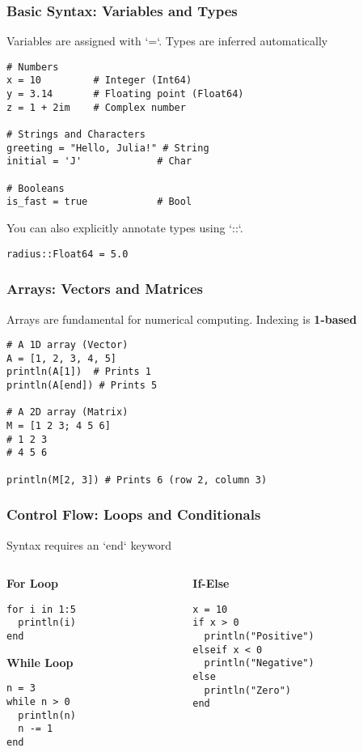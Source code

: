 \documentclass[aspectratio=169]{beamer}\usepackage[]{graphicx}\usepackage[]{xcolor}
\begin{document}
\begin{frame}[fragile]
  \frametitle{Basic Syntax: Variables and Types}
  Variables are assigned with `=`. Types are inferred automatically
  \begin{lstlisting}
# Numbers
x = 10         # Integer (Int64)
y = 3.14       # Floating point (Float64)
z = 1 + 2im    # Complex number

# Strings and Characters
greeting = "Hello, Julia!" # String
initial = 'J'             # Char

# Booleans
is_fast = true            # Bool\end{lstlisting}
  \vfill
  You can also explicitly annotate types using `::`.
  \begin{lstlisting}
radius::Float64 = 5.0\end{lstlisting}
\end{frame}

\begin{frame}[fragile]
  \frametitle{Arrays: Vectors and Matrices}
  Arrays are fundamental for numerical computing. Indexing is \textbf{1-based}
  \begin{lstlisting}
# A 1D array (Vector)
A = [1, 2, 3, 4, 5]
println(A[1])  # Prints 1
println(A[end]) # Prints 5

# A 2D array (Matrix)
M = [1 2 3; 4 5 6]
# 1 2 3
# 4 5 6

println(M[2, 3]) # Prints 6 (row 2, column 3)\end{lstlisting}
\end{frame}

\begin{frame}[fragile]
  \frametitle{Control Flow: Loops and Conditionals}
  Syntax requires an `end` keyword
  \begin{columns}[T]
    \begin{column}{.5\textwidth}
      \textbf{For Loop}
      \begin{lstlisting}
for i in 1:5
  println(i)
end\end{lstlisting}
      \textbf{While Loop}
      \begin{lstlisting}
n = 3
while n > 0
  println(n)
  n -= 1
end\end{lstlisting}
    \end{column}
    \begin{column}{.5\textwidth}
      \textbf{If-Else}
      \begin{lstlisting}
x = 10
if x > 0
  println("Positive")
elseif x < 0
  println("Negative")
else
  println("Zero")
end\end{lstlisting}
    \end{column}
  \end{columns}
\end{frame}
\end{document}
